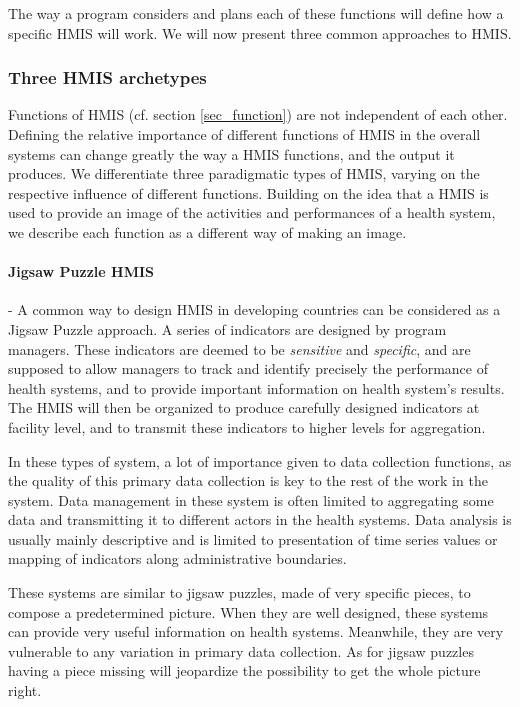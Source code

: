\documentclass[a4paper,11pt,draft,twoside]{article}
\begin{document}
The way a program considers and plans each of these functions will define how a specific HMIS will work. We will now present three common approaches to HMIS.

        \subsubsection{Three HMIS archetypes}

Functions of HMIS (cf. section \ref{sec_function}) are not independent of each other. Defining the relative importance of different functions of HMIS in the overall systems can change greatly the way a HMIS functions, and the output it produces. We differentiate three paradigmatic types of HMIS, varying on the respective influence of different functions. Building on the idea that a HMIS is used to provide an image of the activities and performances of a health system, we describe each function as a different way of making an image.

\paragraph{Jigsaw Puzzle HMIS} - A common way to design HMIS in developing countries can be considered as a Jigsaw Puzzle approach. A series of indicators are designed by program managers. These indicators are deemed to be \textit{sensitive} and \textit{specific}, and are supposed to allow managers to track and identify precisely the performance of health systems, and to provide important information on health system's results. The HMIS will then be organized to produce carefully designed indicators at facility level, and to transmit these indicators to higher levels for aggregation.

In these types of system, a lot of importance given to data collection functions, as the quality of this primary data collection is key to the rest of the work in the system. Data management in these system is often limited to aggregating some data and transmitting it to different actors in the health systems. Data analysis is usually mainly descriptive and is limited to presentation of time series values or mapping of indicators along administrative boundaries.

These systems are similar to jigsaw puzzles, made of very specific pieces, to compose a predetermined picture. When they are well designed, these systems can provide very useful information on health systems. Meanwhile, they are very vulnerable to any variation in primary data collection. As for jigsaw puzzles having a piece missing will jeopardize the possibility to get the whole picture right.
\end{document}
